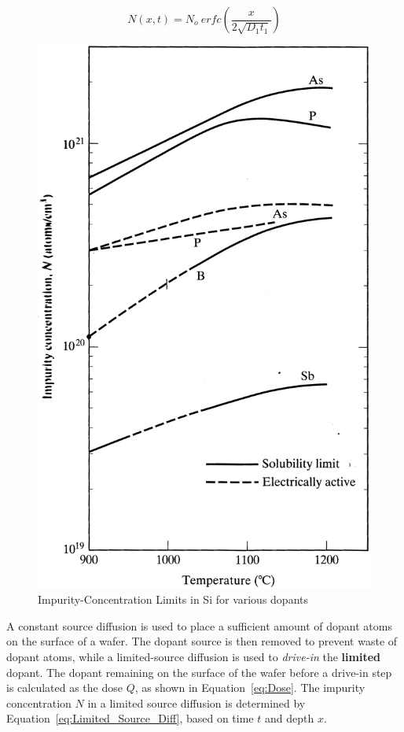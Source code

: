 \documentclass[letter,12pt]{article}
\begin{document}
			\begin{equation}				
				N(x,t) = N_o~erfc\left(\frac{x}{2 \sqrt{D_1 t_1}}\right)
				\label{eq:Constant_Source_Diff}
			\end{equation}
			
			\begin{figure}[h]
				\centering
				\includegraphics[scale=1]{./Images/No_Impurity_Concentration.png}
				\caption{Impurity-Concentration Limits in Si for various dopants \cite{Jaeger_02}}
				\label{fig:N_o}
			\end{figure}			
			
			A constant source diffusion is used to place a sufficient amount of dopant atoms on the surface of a wafer.  The dopant source is then removed to prevent waste of dopant atoms, while a limited-source diffusion is used to \textit{drive-in} the \textbf{limited} dopant.  The dopant remaining on the surface of the wafer before a drive-in step is calculated as the dose $Q$, as shown in Equation~\ref{eq:Dose}. The impurity concentration $N$ in a limited source diffusion is determined by Equation~\ref{eq:Limited_Source_Diff}, based on time $t$ and depth $x$.
			
\end{document}
